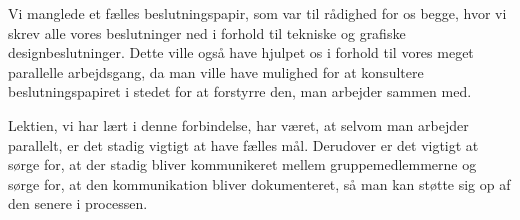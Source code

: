 Vi manglede et fælles beslutningspapir, som var til rådighed for os begge, hvor vi skrev alle vores beslutninger ned i forhold til tekniske og grafiske designbeslutninger. Dette ville også have hjulpet os i forhold til vores meget parallelle arbejdsgang, da man ville have mulighed for at konsultere beslutningspapiret i stedet for at forstyrre den, man arbejder sammen med.

Lektien, vi har lært i denne forbindelse, har været, at selvom man arbejder parallelt, er det stadig vigtigt at have fælles mål. Derudover er det vigtigt at sørge for, at der stadig bliver kommunikeret mellem gruppemedlemmerne og sørge for, at den kommunikation bliver dokumenteret, så man kan støtte sig op af den senere i processen.